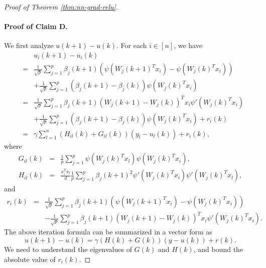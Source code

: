 \begin{proof}[Proof of Theorem \ref{thm:nn-grad-relu}]
\paragraph{Proof of Claim D.} We first analyze $u(k+1)-u(k)$. For each $i\in[n]$, we have
\begin{eqnarray*}
&& u_i(k+1) - u_i(k) \\
&=& \frac{1}{\sqrt{p}}\sum_{j=1}^p\beta_j(k+1)\left(\psi(W_j(k+1)^Tx_i)-\psi(W_j(k)^Tx_i)\right) \\
&& + \frac{1}{\sqrt{p}}\sum_{j=1}^p(\beta_j(k+1)-\beta_j(k))\psi(W_j(k)^Tx_i) \\
&=& \frac{1}{\sqrt{p}}\sum_{j=1}^p\beta_j(k+1)(W_j(k+1)-W_j(k))^Tx_i\psi'(W_j(k)^Tx_i) \\
&& + \frac{1}{\sqrt{p}}\sum_{j=1}^p(\beta_j(k+1)-\beta_j(k))\psi(W_j(k)^Tx_i) + r_i(k) \\
&=& \gamma\sum_{l=1}^n(H_{il}(k)+G_{il}(k))(y_l-u_l(k)) + r_i(k),
\end{eqnarray*}
where
\begin{eqnarray*}
G_{il}(k) &=& \frac{1}{p}\sum_{j=1}^p\psi(W_j(k)^Tx_l)\psi(W_j(k)^Tx_i), \\
H_{il}(k) &=& \frac{x_i^Tx_l}{d}\frac{1}{p}\sum_{j=1}^p\beta_j(k+1)^2\psi'(W_j(k)^Tx_i)\psi'(W_j(k)^Tx_l),
\end{eqnarray*}
and
\begin{eqnarray*}
r_i(k) &=& \frac{1}{\sqrt{p}}\sum_{j=1}^p\beta_j(k+1)\left(\psi(W_j(k+1)^Tx_i)-\psi(W_j(k)^Tx_i)\right) \\
&& - \frac{1}{\sqrt{p}}\sum_{j=1}^p\beta_j(k+1)(W_j(k+1)-W_j(k))^Tx_i\psi'(W_j(k)^Tx_i).
\end{eqnarray*}
The above iteration formula can be summarized in a vector form as
\begin{equation}
u(k+1)-u(k)=\gamma(H(k)+G(k))(y-u(k))+r(k). \label{eq:iter-u-relu}
\end{equation}
We need to understand the eigenvalues of $G(k)$ and $H(k)$, and bound the absolute value of $r_i(k)$.


\end{proof}
